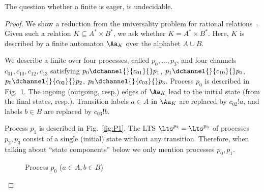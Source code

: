 \documentclass{LMCS}
\newenvironment{proposition}{\begin{prop}}{\end{prop}}
\begin{document}
\begin{proposition}
  The question whether a finite \qcp is eager, is undecidable.
\end{proposition}
\begin{proof}
  We show a reduction from the universality problem for rational
  relations~\cite{berstel79}. Given such a relation
  $K \subseteq A^* \times B^*$, we ask whether $K = A^* \times B^*$.
  Here, $K$ is described by a finite automaton $\Aa_K$ over the alphabet
  $A \cup B$.

  We describe a finite \qcp over four processes, called $p_0,\ldots,p_3$,
  and four channels $c_{01}, c_{10}, c_{12}, c_{13}$ satisfying
  $p_0\dchannel{}{c_{01}}{}p_1$,
  $p_1\dchannel{}{c_{10}}{}p_0$,
  $p_0\dchannel{}{c_{02}}{}p_2$,
  $p_0\dchannel{}{c_{03}}{}p_3$.
  Process $p_0$ is described in Fig.~\ref{fig:P0}.
  The ingoing (outgoing, resp.) edges of $\Aa_K$ lead to the
  initial state (from the final states, resp.). Transition labels
  $a \in A$ in $\Aa_K$ are replaced by $c_{02} ! a$, and labels
  $b \in B$ are replaced by $c_{03} ! b$.

  Process $p_1$ is described in Fig.~\ref{fig:P1}.
  The LTS $\Lts^{p_2} = \Lts^{p_3}$ of processes $p_2,p_3$ consist of a
  single (initial) state without any transition.
  Therefore, when talking about ``state components'' below we only mention
  processes $p_0,p_1$.

\begin{figure}
  \centering
{}
  \caption{Process $p_0$ ($a \in A, b\in B$)}
  \label{fig:P0}
\end{figure}


\end{proof}
\end{document}
